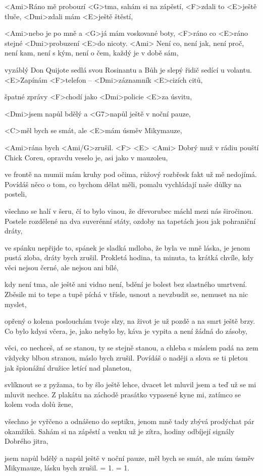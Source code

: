 
\zs
<Ami>Ráno mě probouzí <G>tma, sahám si na zápěstí,
<F>zdali to <E>ještě tluče, <Dmi>zdali mám <E>ještě 
štěstí,

<Ami>nebo je po mně a <G>já mám voskované boty,
<F>ráno co <E>ráno stejné <Dmi>probuzení <E>do nicoty. <Ami>
\ks
\zs
Není co, není jak, není proč, není kam,
není s kým, není o čem, každý je v době sám,

vyzáblý Don Quijote sedlá svou Rosinantu
a Bůh je slepý řidič sedící u volantu.
\ks
\zr
<E>Zapínám <F>telefon -- <Dmi>záznamník <E>cizích citů,

špatné zprávy <F>chodí jako <Dmi>policie <E>za úsvitu,

<Dmi>jsem napůl bdělý a <G7>napůl ještě v noční pauze,

<C>měl bych se smát, ale <E>mám úsměv Mikymauze,

<Ami>rána bych <Ami/G>zrušil. <F> <E> <Ami>
\kr
\zs
Dobrý muž v rádiu pouští Chick Coreu,
opravdu veselo je, asi jako v mauzoleu,

ve frontě na mumii mám kruhy pod očima,
růžový rozbřesk fakt už mě nedojímá.
\ks
\zs
Povídáš něco o tom, co bychom dělat měli,
pomalu vychládají naše důlky na posteli,

všechno se halí v šeru, čí to bylo vinou,
že dřevorubec máchl mezi nás širočinou.
\ks
\zr
Postele rozdělené na dva suverénní státy,
ozdoby na tapetách jsou jak pohraniční dráty,

ve spánku nepřijde to, spánek je sladká mdloba,
že byla ve mně láska, je jenom pustá zloba,
dráty bych zrušil.
\kr
\zs
Prokletá hodina, ta minuta, ta krátká chvíle,
kdy věci nejsou černé, ale nejsou ani bílé,

kdy není tma, ale ještě ani vidno není,
bdění je bolest bez slastného umrtvení.
\ks
\zs
Zběsile mi to tepe a tupě píchá v třísle,
usnout a nevzbudit se, nemuset na nic myslet,

opřený o kolena poslouchám tvoje slzy,
na život je už pozdě a na smrt ještě brzy.
\ks
\zr
Co bylo kdysi včera, je, jako nebylo by,
káva je vypita a není žádná do zásoby,

věci, co nechceš, ať se stanou, ty se stejně stanou,
a chleba s máslem padá na zem vždycky blbou stranou,
máslo bych zrušil.
\kr
\zs
Povídáš o naději a slova se ti pletou
jak špionážní družice letící nad planetou,

svlíknout se z pyžama, to by šlo ještě lehce,
dvacet let mluvil jsem a teď už se mi mluvit nechce.
\ks
\zs
Z plakátu na záchodě prasátko vypasené
kyne mi, zatímco se kolem voda dolů žene,

všechno je vyřčeno a odnášeno do septiku,
jenom mně tady zbývá prodýchat pár okamžiků.
\ks
\zr
Sahám si na zápěstí a venku už je zítra,
hodiny odbíjejí signály Dobrého jitra,

jsem napůl bdělý a napůl ještě v noční pauze,
měl bych se smát, ale mám úsměv Mikymauze,
lásku bych zrušil.
\kr
\zs
= 1.
\ks
\zs
= 1.
\ks
\kp







